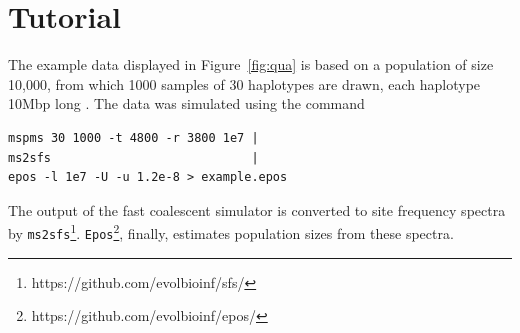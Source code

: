 \documentclass[a4paper]{article}
\newcommand{\ty}{\texttt}
\begin{document}
\section{Tutorial}
The example data displayed in Figure~\ref{fig:qua} is based on a
population of size 10,000, from which 1000 samples of 30 haplotypes are
drawn, each haplotype 10Mbp long \citep[Figure 2a]{liu15:exp}. The
data was simulated using the command
\begin{verbatim}
mspms 30 1000 -t 4800 -r 3800 1e7 |
ms2sfs                            |
epos -l 1e7 -U -u 1.2e-8 > example.epos
\end{verbatim}
The output of the fast coalescent simulator \citep{kel16:eff} is
converted to site frequency spectra by
\ty{ms2sfs}\footnote{https://github.com/evolbioinf/sfs/}. \ty{Epos}\footnote{https://github.com/evolbioinf/epos/},
finally, estimates population sizes from these spectra.
\end{document}
